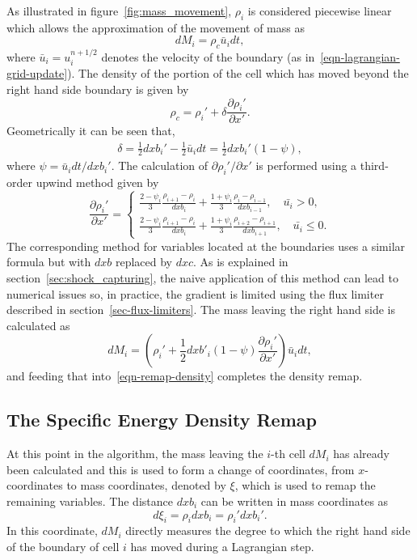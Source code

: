 As illustrated in figure~\ref{fig:mass_movement}, $\rho_i$ is considered piecewise linear which allows the approximation of the movement of mass as
\begin{equation}
  dM_i = \rho_c \bar{u}_i dt,
\end{equation}
where $\bar{u}_i = u_i^{n+1/2}$ denotes the velocity of the boundary (as in~\eqref{eqn-lagrangian-grid-update}). The density of the portion of the cell which has moved beyond the right hand side boundary is given by
\begin{equation}
  \rho_c = \rho_i' + \delta \frac{\partial \rho_i'}{\partial x'}.
\end{equation}
Geometrically it can be seen that,
\begin{align}
  \delta =  \frac{1}{2} dxb_i' - \frac{1}{2} \bar{u}_i dt = \frac{1}{2} dxb_i'(1-\psi),
\end{align}
where $\psi = \bar{u}_i dt / dxb_i'$. The calculation of $\partial\rho_i'/ \partial x'$ is performed using a third-order upwind method given by
\begin{equation}
  \label{eq:upwind_method}
\frac{\partial \rho_i'}{\partial x'} = 
\begin{cases}
\frac{2-\psi_i}{3} \frac{\rho_{i+1} - \rho_i}{dxb_i} + \frac{1+\psi_i}{3}\frac{\rho_i - \rho_{i-1}}{dxb_{i-1}}, \quad \bar{u_i} > 0,\\
\frac{2-\psi_i}{3} \frac{\rho_{i+1} - \rho_i}{dxb_i} + \frac{1+\psi_i}{3}\frac{\rho_{i+2} - \rho_{i+1}}{dxb_{i+1}}, \quad \bar{u_i} \leq 0.
\end{cases}
\end{equation}
The corresponding method for variables located at the boundaries uses a similar formula but with $dxb$ replaced by $dxc$. As is explained in section~\ref{sec:shock_capturing}, the naive application of this method can lead to numerical issues so, in practice, the gradient is limited using the flux limiter described in section~\ref{sec-flux-limiters}. The mass leaving the right hand side is calculated as
\begin{equation}
dM_i = \left( \rho_i' + \frac{1}{2}dxb'_i(1-\psi) \frac{\partial \rho_i'}{\partial x'} \right) \bar{u}_i dt,
\label{eqn-remap-mass-diff}
\end{equation} 
and feeding that into~\eqref{eqn-remap-density} completes the density remap.

\subsection{The Specific Energy Density Remap}
At this point in the algorithm, the mass leaving the $i$-th cell $dM_i$ has already been calculated and this is used to form a change of coordinates, from $x$-coordinates to mass coordinates, denoted by $\xi$, which is used to remap the remaining variables. The distance $dxb_i$ can be written in mass coordinates as
\begin{equation}
\label{eqn-change-of-coord}
  d\xi_i = \rho_i dxb_i = \rho_i' dxb_i'.
\end{equation}
In this coordinate, $dM_i$ directly measures the degree to which the right hand side of the boundary of cell $i$ has moved during a Lagrangian step.

